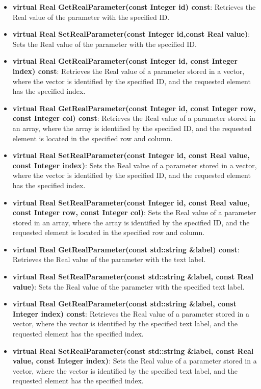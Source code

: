 \begin{itemize}
\item \textbf{virtual Real GetRealParameter(const Integer id) const}: Retrieves the Real value of
the parameter with the specified ID.
\item \textbf{virtual Real SetRealParameter(const Integer id,const Real value)}: Sets the Real
value of the parameter with the specified ID.
\item \textbf{virtual Real GetRealParameter(const Integer id, const Integer index) const}: Retrieves
the Real value of a parameter stored in a vector, where the vector is identified by the specified
ID, and the requested element has the specified index.
\item \textbf{virtual Real GetRealParameter(const Integer id, const Integer row, const Integer
col) const}: Retrieves the Real value of a parameter stored in an array, where the array is
identified by the specified ID, and the requested element is located in the specified row and
column.
\item \textbf{virtual Real SetRealParameter(const Integer id, const Real value, const Integer
index)}: Sets the Real value of a parameter stored in a vector, where the vector is identified by
the specified ID, and the requested element has the specified index.
\item \textbf{virtual Real SetRealParameter(const Integer id, const Real value, const Integer row,
const Integer col)}: Sets the Real value of a parameter stored in an array, where the array is
identified by the specified ID, and the requested element is located in the specified row and
column.
\item \textbf{virtual Real GetRealParameter(const std::string \&label) const}: Retrieves the Real
value of the parameter with the text label.
\item \textbf{virtual Real SetRealParameter(const std::string \&label, const Real value)}: Sets the
Real value of the parameter with the specified text label.
\item \textbf{virtual Real GetRealParameter(const std::string \&label, const Integer index)
const}: Retrieves the Real value of a parameter stored in a vector, where the vector is identified
by the specified text label, and the requested element has the specified index.
\item \textbf{virtual Real SetRealParameter(const std::string \&label, const Real value, const
Integer index)}: Sets the Real value of a parameter stored in a vector, where the vector is
identified by the specified text label, and the requested element has the specified index.

\end{itemize}
